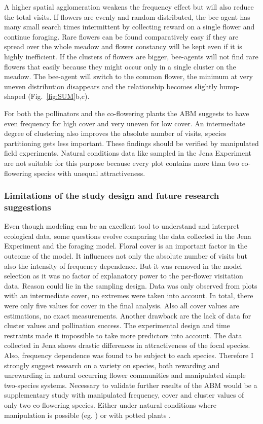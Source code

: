 A higher spatial agglomeration weakens the frequency effect but will also reduce the total visits. If flowers are evenly and random distributed, the bee-agent has many small search times intermittent by collecting reward on a single flower and continue foraging. Rare flowers can be found comparatively easy if they are spread over the whole meadow and flower constancy will be kept even if it is highly inefficient. If the clusters of flowers are bigger, bee-agents will not find rare flowers that easily because they might occur only in a single cluster on the meadow. The bee-agent will switch to the common flower, the minimum at very uneven distribution disappears and the relationship becomes slightly hump-shaped (Fig.~\ref{fig:SUM}b,c). 

For both the pollinators and the co-flowering plants the ABM suggests to have even frequency for high cover and very uneven for low cover. An intermediate degree of clustering also improves the absolute number of visits, species partitioning gets less important. These findings should be verified by manipulated field experiments. Natural conditions data like sampled in the Jena Experiment are not suitable for this purpose because every plot contains more than two co-flowering species with unequal attractiveness.  


\subsubsection*{Limitations of the study design and future research suggestions}

Even though modeling can be an excellent tool to understand and interpret ecological data, some questions evolve comparing the data collected in the Jena Experiment and the foraging model.
Floral cover is an important factor in the outcome of the model. It influences not only the absolute number of visits but also the intensity of frequency dependence. But it was removed in the model selection as it was no factor of explanatory power to the per-flower visitation data. 
Reason could lie in the sampling design. Data was only observed from plots with an intermediate cover, no extremes were taken into account. In total, there were only five values for cover in the final analysis. Also all cover values are estimations, no exact measurements. Another drawback are the lack of data for cluster values and pollination success. The experimental design and time restraints made it impossible to take more predictors into account. The data collected in Jena shows drastic differences in attractiveness of the focal species. Also, frequency dependence was found to be subject to each species. Therefore I strongly suggest research on a variety on species, both rewarding and unrewarding in natural occurring flower communities and manipulated simple two-species systems. 
Necessary to validate further results of the ABM would be a supplementary study with manipulated frequency, cover and cluster values of only two co-flowering species. Either under natural conditions where manipulation is possible (eg. \citealt{Eckhart2006frequency,essenberg2012explaining}) or with potted plants \citep{epperson1987frequency}. 


